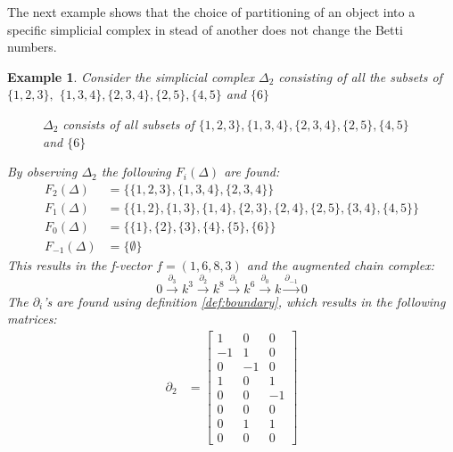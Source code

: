 \documentclass[11pt,a4paper,twoside]{report}
\newtheorem{myex}[mythm]{Example}
\begin{document}
The next example shows that the choice of partitioning of an object into a specific simplicial complex in stead of another does not change the Betti numbers.
\begin{myex}
Consider the simplicial complex $\Delta_2$ consisting of all the subsets of $\{1,2,3\},$ $\{1,3,4\},\{2,3,4\},\{2,5\},\{4,5\}$ and $\{6\}$
\begin{figure}[H]
\center
{}
\caption{$\Delta_2$ consists of all subsets of $\{1,2,3\},\{1,3,4\},\{2,3,4\},\{2,5\},\{4,5\}$ and $\{6\}$}
\label{fig:ex2}
\end{figure}
By observing $\Delta_2$ the following $F_i(\Delta)$ are found:
\begin{align*}
F_2(\Delta) &= \{\{1,2,3\},\{1,3,4\},\{2,3,4\}\}\\
F_1(\Delta) &= \{\{1,2\},\{1,3\},\{1,4\},\{2,3\},\{2,4\},\{2,5\},\{3,4\},\{4,5\}\}\\
F_0(\Delta) &= \{\{1\},\{2\},\{3\},\{4\},\{5\},\{6\}\}\\
F_{-1}(\Delta) &= \{\emptyset\}
\end{align*}
This results in the f-vector $f=(1,6,8,3)$ and the augmented chain complex:
\begin{equation*}
0\overset{\partial_3}{\to} k^3\overset{\partial_2}{\to} k^8\overset{\partial_1}{\to} k^6\overset{\partial_0}{\to} k \overset{\partial_{-1}}{\to} 0
\end{equation*}
The $\partial_i$'s are found using definition \ref{def:boundary}, which results in the following matrices:
\begin{align*}
\partial_2&=
\begin{bmatrix}
1 & 0 & 0 \\
-1 & 1 & 0 \\
0 & -1 & 0 \\
1 & 0 & 1 \\
0 & 0 & -1 \\
0 & 0 & 0 \\
0 & 1 & 1 \\
0 & 0 & 0 
\end{bmatrix}

\end{align*}
\end{myex}
\end{document}
